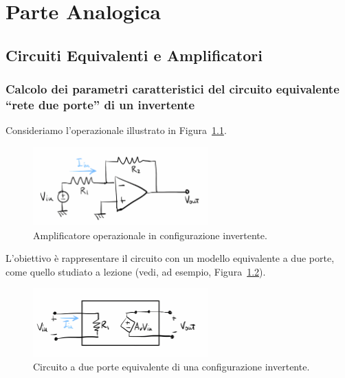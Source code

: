 \chapter{Parte Analogica}

\section{Circuiti Equivalenti e Amplificatori}

\subsection{Calcolo dei parametri caratteristici del circuito equivalente “rete due porte” di un invertente}

Consideriamo l'operazionale illustrato in Figura~\ref{fig:inverting_amp}.\\[2mm]
\begin{figure}[H]
    \centering
    \includegraphics[width=0.6\textwidth]{images/1.1.1.1.png}
    \caption{Amplificatore operazionale in configurazione invertente.}
    \label{fig:inverting_amp}
\end{figure}

L'obiettivo è rappresentare il circuito con un modello equivalente a due porte, come quello studiato a lezione (vedi, ad esempio, Figura~\ref{fig:rete_due_porte_d}).\\[2mm]
\begin{figure}[H]
    \centering
    \includegraphics[width=0.6\textwidth]{images/1.1.1.2.png}
    \caption{Circuito a due porte equivalente di una configurazione invertente.}
    \label{fig:rete_due_porte_d}
\end{figure}

